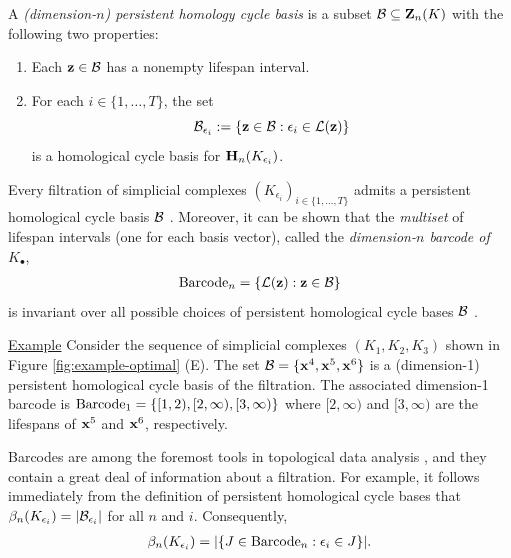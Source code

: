 A \emph{(dimension-$n$) persistent homology cycle basis} is a subset $\mathcal B \subseteq \mathbf{Z}_n(K)$ with the following two properties:
    \begin{enumerate}
    \item Each ${\mathbf z} \in \mathcal B$ has a nonempty lifespan interval.
    \item For each $i \in \{1, \ldots, T\}$, the set 
        $$
        \mathcal B_{\epsilon_i} 
        := 
        \{{\mathbf z} \in \mathcal B : \epsilon_i \in \mathcal{L}({\mathbf z}) \}
        $$
    is a homological cycle basis for $\mathbf{H}_n(K_{\epsilon_i})$.
    \end{enumerate}
 
 
Every filtration of simplicial complexes $ (K_{\epsilon_i})_{i \in\{ 1, \ldots, T\}}$ admits a  persistent homological cycle basis  $\mathcal B$ \cite{zomorodiancarlssoncomputingph}.  
Moreover, it can be shown that the \emph{multiset} of lifespan intervals (one for each basis vector), called the \emph{dimension-$n$ barcode of $K_\bullet$},
    \begin{align*}
        \mathrm{Barcode}_n = 
        \{ \mathcal{L}({\mathbf z}) : {\mathbf z} \in \mathcal B \}
    \end{align*}
is invariant over all possible choices of persistent homological cycle bases $\mathcal B$ \cite{zomorodiancarlssoncomputingph}.  

\noindent \underline{Example}  Consider the sequence of simplicial complexes $(K_1, K_2, K_3)$ shown in Figure \ref{fig:example-optimal} (E).  The set
    $
        \mathcal B = \{\mathbf{x}^4, \mathbf{x}^5, \mathbf{x}^6 \}
    $
is a (dimension-1) persistent homological cycle basis of the filtration.  The associated dimension-1 barcode is     
    $
    \mathrm{Barcode}_1 = \{[1,2), [2,\infty), [3, \infty) \} 
    $ 
where $[2,\infty)$ and $[3,\infty)$ are the lifespans of  $\mathbf{x}^5$ and $\mathbf{x}^6$, respectively.

Barcodes are among the foremost tools in topological data analysis \cite{barcodeGhrist,  persistenthomologyasurvey}, and they contain a great deal of information about a filtration.  For example, it follows  immediately from the definition of persistent homological cycle bases  that
    $
        \beta_n(K_{\epsilon_i})
        =
        |\mathcal B_{\epsilon_i}|
    $
for all $n$ and $i$.  Consequently,
    \begin{align*}
        \beta_n(K_{\epsilon_i})
        =
        |\{J \in \mathrm{Barcode}_n : \epsilon_i \in J \}|.
    \end{align*}

